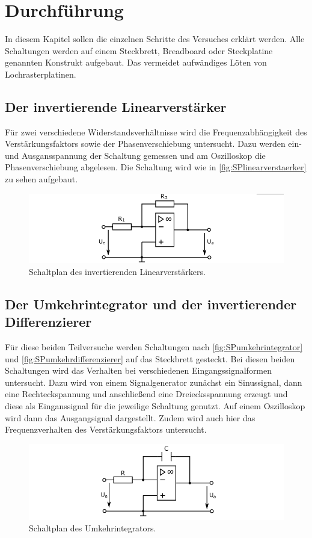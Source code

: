 \section{Durchführung}
\label{sec:Durchfuehrung}
In diesem Kapitel sollen die einzelnen Schritte des Versuches erklärt werden.
Alle Schaltungen werden auf einem Steckbrett, Breadboard oder Steckplatine genannten Konstrukt
aufgebaut. Das vermeidet aufwändiges Löten von Lochrasterplatinen.


\subsection{Der invertierende Linearverstärker}
Für zwei verschiedene Widerstandsverhältnisse wird die Frequenzabhängigkeit 
des Verstärkungsfaktors sowie der Phasenverschiebung untersucht. Dazu werden ein- 
und Ausgansspannung der Schaltung gemessen und am Oszilloskop die Phasenverschiebung abgelesen.
Die Schaltung wird wie in \autoref{fig:SPlinearverstaerker} zu sehen aufgebaut.
\begin{figure}
    \centering
    \includegraphics[width=1\textwidth]{content/grafiken/SPlinearverstaerker.PNG}
    \caption{Schaltplan des invertierenden Linearverstärkers. }
    \label{fig:SPlinearverstaerker}
  \end{figure}



\subsection{Der Umkehrintegrator und der invertierender Differenzierer}
Für diese beiden Teilversuche werden Schaltungen nach \autoref{fig:SPumkehrintegrator} und 
\autoref{fig:SPumkehrdifferenzierer} auf das Steckbrett gesteckt.
Bei diesen beiden Schaltungen wird das Verhalten bei verschiedenen Eingangssignalformen untersucht.
Dazu wird von einem Signalgenerator zunächst ein Sinussignal, dann eine Rechteckspannung und anschließend
eine Dreiecksspannung erzeugt und diese als Einganssignal für die jeweilige Schaltung genutzt.
Auf einem Oszilloskop wird dann das Ausgangsignal dargestellt.
Zudem wird auch hier das Frequenzverhalten des Verstärkungsfaktors untersucht.
\begin{figure}
    \centering
    \includegraphics[width=1\textwidth]{content/grafiken/SPumkehrintegrator.PNG}
    \caption{Schaltplan des Umkehrintegrators.}
    \label{fig:SPumkehrintegrator}
  \end{figure}

